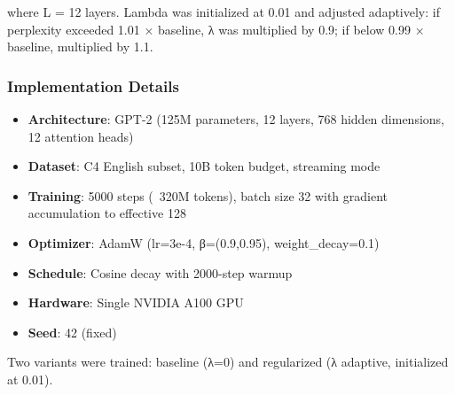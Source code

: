 where L = 12 layers. Lambda was initialized at 0.01 and adjusted adaptively: if perplexity exceeded 1.01 × baseline, λ was multiplied by 0.9; if below 0.99 × baseline, multiplied by 1.1.

\subsubsection{Implementation Details}

\begin{itemize}
\item \textbf{Architecture}: GPT-2 (125M parameters, 12 layers, 768 hidden dimensions, 12 attention heads)
\item \textbf{Dataset}: C4 English subset, 10B token budget, streaming mode
\item \textbf{Training}: 5000 steps (~320M tokens), batch size 32 with gradient accumulation to effective 128
\item \textbf{Optimizer}: AdamW (lr=3e-4, β=(0.9,0.95), weight_decay=0.1)
\item \textbf{Schedule}: Cosine decay with 2000-step warmup
\item \textbf{Hardware}: Single NVIDIA A100 GPU
\item \textbf{Seed}: 42 (fixed)
\end{itemize}

Two variants were trained: baseline (λ=0) and regularized (λ adaptive, initialized at 0.01).
